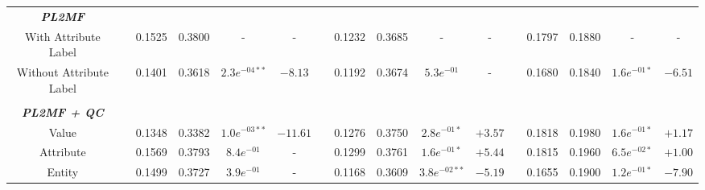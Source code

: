 \begin{table*}
{\begin{tabular}{cc@{\hs}rrccc@{\hs}rrccc@{\hs}rrcc}
\emph{\textbf{PL2MF}} & \multicolumn{15}{c}{\phantom{a}} \\
{\raggedright With Attribute Label} & \phantom{a} & 0.1525 & 0.3800 & - & -
                                    & \phantom{a} & 0.1232 & 0.3685 & - & -
                                    & \phantom{a} & 0.1797 & 0.1880 & - & -
                        \\
{\raggedright Without Attribute Label} & \phantom{a} & 0.1401 & 0.3618 & $2.3e^{-04**}$ & $-8.13$
                                       & \phantom{a} & 0.1192 & 0.3674 & $5.3e^{-01}$ & -
                                       & \phantom{a} & 0.1680 & 0.1840 & $1.6e^{-01*}$ & $-6.51$
                           \\
\\
\emph{\textbf{PL2MF + QC}} & \multicolumn{15}{c}{\phantom{a}} \\
{\raggedright Value} & \phantom{a} & 0.1348 & 0.3382 & $1.0e^{-03**}$ & $-11.61$
                     & \phantom{a} & 0.1276 & 0.3750 & $2.8e^{-01*}$ & $+3.57$
                     & \phantom{a} & 0.1818 & 0.1980 & $1.6e^{-01*}$ & $+1.17$
         \\
{\raggedright Attribute} & \phantom{a} & 0.1569 & 0.3793 & $8.4e^{-01}$ & -
                         & \phantom{a} & 0.1299 & 0.3761 & $1.6e^{-01*}$ & $+5.44$
                         & \phantom{a} & 0.1815 & 0.1960 & $6.5e^{-02*}$ & $+1.00$
             \\
{\raggedright Entity} & \phantom{a} & 0.1499 & 0.3727 & $3.9e^{-01}$ & -
                      & \phantom{a} & 0.1168 & 0.3609 & $3.8e^{-02**}$ & $-5.19$
                      & \phantom{a} & 0.1655 & 0.1900 & $1.2e^{-01*}$ & $-7.90$
          \\

\end{tabular}}
\end{table*}
